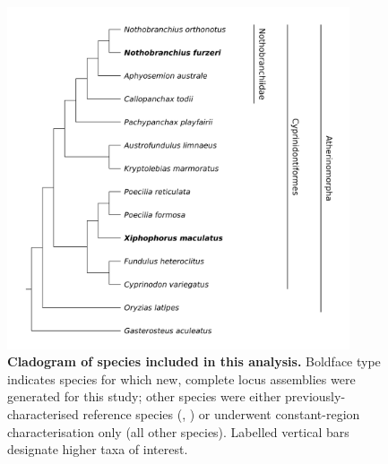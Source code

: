 \begin{figure}
	\centering
	\includegraphics[width=0.9\textwidth]{_Figures/png/species-tree-large-taxa}
	\caption[Cladogram of analysed species]{\textbf{Cladogram of species included in this analysis.} Boldface type indicates species for which new, complete \igh{} locus assemblies were generated for this study; other species were either previously-characterised reference species (, ) or underwent constant-region characterisation only (all other species). Labelled vertical bars designate higher taxa of interest.}
	\label{fig:species-tree-large-taxa}
\end{figure}









